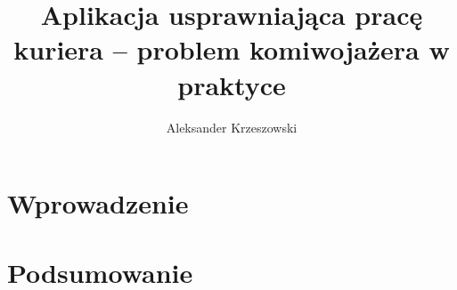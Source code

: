 \documentclass[10pt,a4paper]{report}
\begin{document}
	\author{Aleksander Krzeszowski}
	\title{Aplikacja usprawniająca pracę kuriera -- problem komiwojażera w praktyce}
	\maketitle
	
	\tableofcontents
	
	\chapter{Wprowadzenie}
	
	
	\chapter{Podsumowanie}
\end{document}
